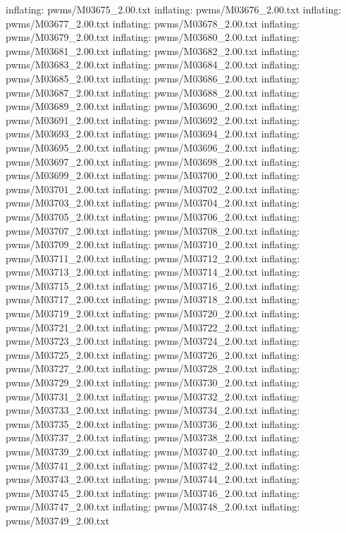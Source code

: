 \documentclass[letterpaper,10pt,english]{sphinxmanual}
\begin{document}
{\begin{sphinxVerbatim}[commandchars=\\\{\}]
  inflating: pwms/M03675\_2.00.txt
  inflating: pwms/M03676\_2.00.txt
  inflating: pwms/M03677\_2.00.txt
  inflating: pwms/M03678\_2.00.txt
  inflating: pwms/M03679\_2.00.txt
  inflating: pwms/M03680\_2.00.txt
  inflating: pwms/M03681\_2.00.txt
  inflating: pwms/M03682\_2.00.txt
  inflating: pwms/M03683\_2.00.txt
  inflating: pwms/M03684\_2.00.txt
  inflating: pwms/M03685\_2.00.txt
  inflating: pwms/M03686\_2.00.txt
  inflating: pwms/M03687\_2.00.txt
  inflating: pwms/M03688\_2.00.txt
  inflating: pwms/M03689\_2.00.txt
  inflating: pwms/M03690\_2.00.txt
  inflating: pwms/M03691\_2.00.txt
  inflating: pwms/M03692\_2.00.txt
  inflating: pwms/M03693\_2.00.txt
  inflating: pwms/M03694\_2.00.txt
  inflating: pwms/M03695\_2.00.txt
  inflating: pwms/M03696\_2.00.txt
  inflating: pwms/M03697\_2.00.txt
  inflating: pwms/M03698\_2.00.txt
  inflating: pwms/M03699\_2.00.txt
  inflating: pwms/M03700\_2.00.txt
  inflating: pwms/M03701\_2.00.txt
  inflating: pwms/M03702\_2.00.txt
  inflating: pwms/M03703\_2.00.txt
  inflating: pwms/M03704\_2.00.txt
  inflating: pwms/M03705\_2.00.txt
  inflating: pwms/M03706\_2.00.txt
  inflating: pwms/M03707\_2.00.txt
  inflating: pwms/M03708\_2.00.txt
  inflating: pwms/M03709\_2.00.txt
  inflating: pwms/M03710\_2.00.txt
  inflating: pwms/M03711\_2.00.txt
  inflating: pwms/M03712\_2.00.txt
  inflating: pwms/M03713\_2.00.txt
  inflating: pwms/M03714\_2.00.txt
  inflating: pwms/M03715\_2.00.txt
  inflating: pwms/M03716\_2.00.txt
  inflating: pwms/M03717\_2.00.txt
  inflating: pwms/M03718\_2.00.txt
  inflating: pwms/M03719\_2.00.txt
  inflating: pwms/M03720\_2.00.txt
  inflating: pwms/M03721\_2.00.txt
  inflating: pwms/M03722\_2.00.txt
  inflating: pwms/M03723\_2.00.txt
  inflating: pwms/M03724\_2.00.txt
  inflating: pwms/M03725\_2.00.txt
  inflating: pwms/M03726\_2.00.txt
  inflating: pwms/M03727\_2.00.txt
  inflating: pwms/M03728\_2.00.txt
  inflating: pwms/M03729\_2.00.txt
  inflating: pwms/M03730\_2.00.txt
  inflating: pwms/M03731\_2.00.txt
  inflating: pwms/M03732\_2.00.txt
  inflating: pwms/M03733\_2.00.txt
  inflating: pwms/M03734\_2.00.txt
  inflating: pwms/M03735\_2.00.txt
  inflating: pwms/M03736\_2.00.txt
  inflating: pwms/M03737\_2.00.txt
  inflating: pwms/M03738\_2.00.txt
  inflating: pwms/M03739\_2.00.txt
  inflating: pwms/M03740\_2.00.txt
  inflating: pwms/M03741\_2.00.txt
  inflating: pwms/M03742\_2.00.txt
  inflating: pwms/M03743\_2.00.txt
  inflating: pwms/M03744\_2.00.txt
  inflating: pwms/M03745\_2.00.txt
  inflating: pwms/M03746\_2.00.txt
  inflating: pwms/M03747\_2.00.txt
  inflating: pwms/M03748\_2.00.txt
  inflating: pwms/M03749\_2.00.txt

\end{sphinxVerbatim}}
\end{document}
